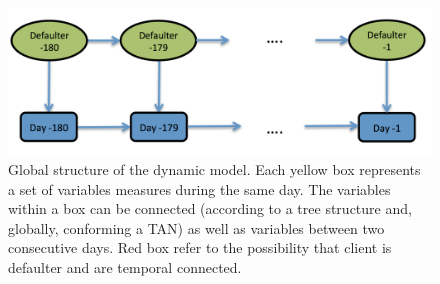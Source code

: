 \begin{figure}
\begin{center}
\includegraphics[scale=0.45]{./figures/CajaMarModel1}
\caption{Global structure of the dynamic model. Each yellow box represents a set of variables measures during the same day.
The variables within a box can be connected (according to a tree structure and, globally, conforming a TAN) as well as variables between two consecutive days. Red box refer to the possibility that 
client is defaulter and are temporal connected.}
\label{fig:global_temp}
\end{center}
\end{figure}



